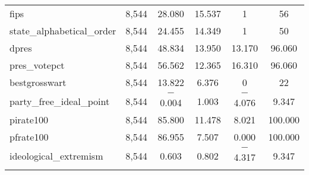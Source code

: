 \documentclass[12pt]{article}
\begin{document}
\begin{table}[H]
\begin{tabular}{@{\extracolsep{5pt}}lccccc}
		fips & 8,544 & 28.080 & 15.537 & 1 & 56 \\ 
		state\_alphabetical\_order & 8,544 & 24.455 & 14.349 & 1 & 50 \\ 
		dpres & 8,544 & 48.834 & 13.950 & 13.170 & 96.060 \\ 
		pres\_votepct & 8,544 & 56.562 & 12.365 & 16.310 & 96.060 \\ 
		bestgrosswart & 8,544 & 13.822 & 6.376 & 0 & 22 \\ 
		party\_free\_ideal\_point & 8,544 & $-$0.004 & 1.003 & $-$4.076 & 9.347 \\ 
		pirate100 & 8,544 & 85.800 & 11.478 & 8.021 & 100.000 \\ 
		pfrate100 & 8,544 & 86.955 & 7.507 & 0.000 & 100.000 \\ 
		ideological\_extremism & 8,544 & 0.603 & 0.802 & $-$4.317 & 9.347 \\ 
		\hline \\[-1.8ex] 
	\end{tabular} 
\end{table} 
\end{document}
